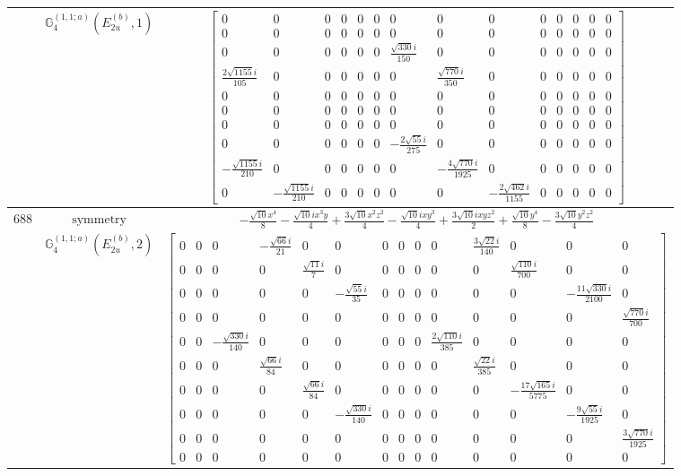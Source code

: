 \documentclass[fleqn,8pt,landscape]{jsarticle}
\begin{document}
\begin{longtable}{ccc}
$  $ & $ \mathbb{G}_{4}^{(1,1;a)}(E_{2u}^{(b)},1) $ & $ \begin{bmatrix} 0 & 0 & 0 & 0 & 0 & 0 & 0 & 0 & 0 & 0 & 0 & 0 & 0 & 0 \\ 0 & 0 & 0 & 0 & 0 & 0 & 0 & 0 & 0 & 0 & 0 & 0 & 0 & 0 \\ 0 & 0 & 0 & 0 & 0 & 0 & \frac{\sqrt{330} i}{150} & 0 & 0 & 0 & 0 & 0 & 0 & 0 \\ \frac{2 \sqrt{1155} i}{105} & 0 & 0 & 0 & 0 & 0 & 0 & \frac{\sqrt{770} i}{350} & 0 & 0 & 0 & 0 & 0 & 0 \\ 0 & 0 & 0 & 0 & 0 & 0 & 0 & 0 & 0 & 0 & 0 & 0 & 0 & 0 \\ 0 & 0 & 0 & 0 & 0 & 0 & 0 & 0 & 0 & 0 & 0 & 0 & 0 & 0 \\ 0 & 0 & 0 & 0 & 0 & 0 & 0 & 0 & 0 & 0 & 0 & 0 & 0 & 0 \\ 0 & 0 & 0 & 0 & 0 & 0 & - \frac{2 \sqrt{55} i}{275} & 0 & 0 & 0 & 0 & 0 & 0 & 0 \\ - \frac{\sqrt{1155} i}{210} & 0 & 0 & 0 & 0 & 0 & 0 & - \frac{4 \sqrt{770} i}{1925} & 0 & 0 & 0 & 0 & 0 & 0 \\ 0 & - \frac{\sqrt{1155} i}{210} & 0 & 0 & 0 & 0 & 0 & 0 & - \frac{2 \sqrt{462} i}{1155} & 0 & 0 & 0 & 0 & 0 \end{bmatrix} $ \\ \hline
$ 688 $ & $ \text{symmetry} $ & $ - \frac{\sqrt{10} x^{4}}{8} - \frac{\sqrt{10} i x^{3} y}{4} + \frac{3 \sqrt{10} x^{2} z^{2}}{4} - \frac{\sqrt{10} i x y^{3}}{4} + \frac{3 \sqrt{10} i x y z^{2}}{2} + \frac{\sqrt{10} y^{4}}{8} - \frac{3 \sqrt{10} y^{2} z^{2}}{4} $ \\
$  $ & $ \mathbb{G}_{4}^{(1,1;a)}(E_{2u}^{(b)},2) $ & $ \begin{bmatrix} 0 & 0 & 0 & - \frac{\sqrt{66} i}{21} & 0 & 0 & 0 & 0 & 0 & 0 & \frac{3 \sqrt{22} i}{140} & 0 & 0 & 0 \\ 0 & 0 & 0 & 0 & \frac{\sqrt{11} i}{7} & 0 & 0 & 0 & 0 & 0 & 0 & \frac{\sqrt{110} i}{700} & 0 & 0 \\ 0 & 0 & 0 & 0 & 0 & - \frac{\sqrt{55} i}{35} & 0 & 0 & 0 & 0 & 0 & 0 & - \frac{11 \sqrt{330} i}{2100} & 0 \\ 0 & 0 & 0 & 0 & 0 & 0 & 0 & 0 & 0 & 0 & 0 & 0 & 0 & \frac{\sqrt{770} i}{700} \\ 0 & 0 & - \frac{\sqrt{330} i}{140} & 0 & 0 & 0 & 0 & 0 & 0 & \frac{2 \sqrt{110} i}{385} & 0 & 0 & 0 & 0 \\ 0 & 0 & 0 & \frac{\sqrt{66} i}{84} & 0 & 0 & 0 & 0 & 0 & 0 & \frac{\sqrt{22} i}{385} & 0 & 0 & 0 \\ 0 & 0 & 0 & 0 & \frac{\sqrt{66} i}{84} & 0 & 0 & 0 & 0 & 0 & 0 & - \frac{17 \sqrt{165} i}{5775} & 0 & 0 \\ 0 & 0 & 0 & 0 & 0 & - \frac{\sqrt{330} i}{140} & 0 & 0 & 0 & 0 & 0 & 0 & - \frac{9 \sqrt{55} i}{1925} & 0 \\ 0 & 0 & 0 & 0 & 0 & 0 & 0 & 0 & 0 & 0 & 0 & 0 & 0 & \frac{3 \sqrt{770} i}{1925} \\ 0 & 0 & 0 & 0 & 0 & 0 & 0 & 0 & 0 & 0 & 0 & 0 & 0 & 0 \end{bmatrix} $ \\ \hline

\end{longtable}
\end{document}
